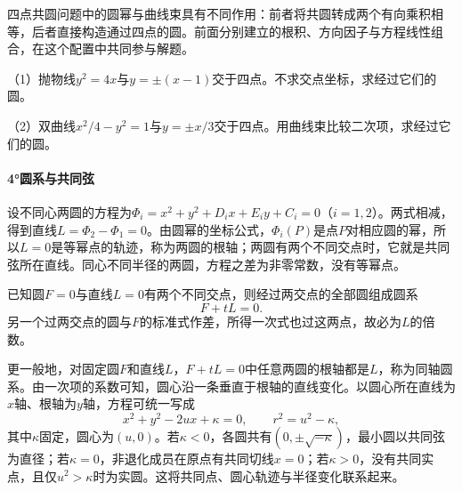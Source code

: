 四点共圆问题中的圆幂与曲线束具有不同作用：前者将共圆转成两个有向乘积相等，后者直接构造通过四点的圆。前面分别建立的根积、方向因子与方程线性组合，在这个配置中共同参与解题。

\begingroup
\setlength{\parskip}{2pt}
\begin{exercise}
\mbox{}\par\nobreak
\begin{samepage}
（1）抛物线\(y^2=4x\)与\(y=\pm(x-1)\)交于四点。不求交点坐标，求经过它们的圆。
\par
\end{samepage}

\begin{samepage}
（2）双曲线\(x^2/4-y^2=1\)与\(y=\pm x/3\)交于四点。用曲线束比较二次项，求经过它们的圆。
\par
\end{samepage}
\end{exercise}
\endgroup

\newpage
\paragraph{4°圆系与共同弦} \mbox{}

设不同心两圆的方程为\(\Phi_i=x^2+y^2+D_ix+E_iy+C_i=0\)（\(i=1,2\)）。两式相减，得到直线\(L=\Phi_2-\Phi_1=0\)。由圆幂的坐标公式，\(\Phi_i(P)\)是点\(P\)对相应圆的幂，所以\(L=0\)是等幂点的轨迹，称为两圆的{\heiti{}根轴}；两圆有两个不同交点时，它就是共同弦所在直线。同心不同半径的两圆，方程之差为非零常数，没有等幂点。

已知圆\(F=0\)与直线\(L=0\)有两个不同交点，则经过两交点的全部圆组成圆系
\begin{equation}\label{eq:quadratic-circle-family-common-chord}
    F+tL=0 .
\end{equation}
另一个过两交点的圆与\(F\)的标准式作差，所得一次式也过这两点，故必为\(L\)的倍数。

更一般地，对固定圆\(F\)和直线\(L\)，\(F+tL=0\)中任意两圆的根轴都是\(L\)，称为{\heiti{}同轴圆系}。由一次项的系数可知，圆心沿一条垂直于根轴的直线变化。以圆心所在直线为\(x\)轴、根轴为\(y\)轴，方程可统一写成
\begin{equation}\label{eq:quadratic-coaxial-circle-family}
    x^2+y^2-2ux+\kappa=0,\qquad r^2=u^2-\kappa ,
\end{equation}
其中\(\kappa\)固定，圆心为\((u,0)\)。若\(\kappa<0\)，各圆共有\((0,\pm\sqrt{-\kappa})\)，最小圆以共同弦为直径；若\(\kappa=0\)，非退化成员在原点有共同切线\(x=0\)；若\(\kappa>0\)，没有共同实点，且仅\(u^2>\kappa\)时为实圆。这将共同点、圆心轨迹与半径变化联系起来。

